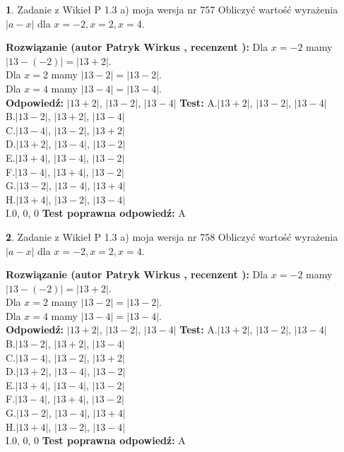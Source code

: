 \documentclass[12pt, a4paper]{article}
\theoremstyle{definition} %
\newtheorem{zad}{}
\newcommand{\zadStart}[1]{\begin{zad}#1\newline}
\newcommand{\zadStop}{\end{zad}}
\newcommand{\rozwStart}[2]{\noindent \textbf{Rozwiązanie (autor #1 , recenzent #2): }\newline}
\newcommand{\rozwStop}{\newline}
\newcommand{\odpStart}{\noindent \textbf{Odpowiedź:}\newline}
\newcommand{\odpStop}{\newline}
\newcommand{\testStart}{\noindent \textbf{Test:}\newline}
\newcommand{\testStop}{\newline}
\newcommand{\kluczStart}{\noindent \textbf{Test poprawna odpowiedź:}\newline}
\newcommand{\kluczStop}{\newline}
\begin{document}
\zadStart{Zadanie z Wikieł P 1.3 a) moja wersja nr 757}
Obliczyć wartość wyrażenia $|a - x|$ dla $x=-2,x=2,x=4$.
\zadStop
\rozwStart{Patryk Wirkus}{}
Dla $x = -2$ mamy $|13 - (-2)| = |13 + 2|$.\\
Dla $x = 2$ mamy $|13 - 2| = |13 - 2|$.\\
Dla $x = 4$ mamy $|13 - 4| = |13 - 4|$.\\
\rozwStop
\odpStart
$|13 + 2|$, $|13 - 2|$, $|13 - 4|$
\odpStop
\testStart
A.$|13 + 2|$, $|13 - 2|$, $|13 - 4|$\\
B.$|13 - 2|$, $|13 + 2|$, $|13 - 4|$\\
C.$|13 - 4|$, $|13 - 2|$, $|13 + 2|$\\
D.$|13 + 2|$, $|13 - 4|$, $|13 - 2|$\\
E.$|13 + 4|$, $|13 - 4|$, $|13 - 2|$\\
F.$|13 - 4|$, $|13 + 4|$, $|13 - 2|$\\
G.$|13 - 2|$, $|13 - 4|$, $|13 + 4|$\\
H.$|13 + 4|$, $|13 - 2|$, $|13 - 4|$\\
I.$0$, $0$, $0$
\testStop
\kluczStart
A
\kluczStop



\zadStart{Zadanie z Wikieł P 1.3 a) moja wersja nr 758}
Obliczyć wartość wyrażenia $|a - x|$ dla $x=-2,x=2,x=4$.
\zadStop
\rozwStart{Patryk Wirkus}{}
Dla $x = -2$ mamy $|13 - (-2)| = |13 + 2|$.\\
Dla $x = 2$ mamy $|13 - 2| = |13 - 2|$.\\
Dla $x = 4$ mamy $|13 - 4| = |13 - 4|$.\\
\rozwStop
\odpStart
$|13 + 2|$, $|13 - 2|$, $|13 - 4|$
\odpStop
\testStart
A.$|13 + 2|$, $|13 - 2|$, $|13 - 4|$\\
B.$|13 - 2|$, $|13 + 2|$, $|13 - 4|$\\
C.$|13 - 4|$, $|13 - 2|$, $|13 + 2|$\\
D.$|13 + 2|$, $|13 - 4|$, $|13 - 2|$\\
E.$|13 + 4|$, $|13 - 4|$, $|13 - 2|$\\
F.$|13 - 4|$, $|13 + 4|$, $|13 - 2|$\\
G.$|13 - 2|$, $|13 - 4|$, $|13 + 4|$\\
H.$|13 + 4|$, $|13 - 2|$, $|13 - 4|$\\
I.$0$, $0$, $0$
\testStop
\kluczStart
A
\kluczStop
\end{document}
